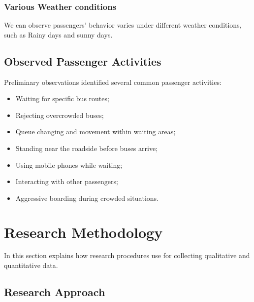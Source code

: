 \documentclass[12pt,a4paper]{report}
\begin{document}


\subsection{Various Weather conditions}
We can observe passengers’ behavior varies under different weather conditions, such as Rainy days and sunny days. 

\section{Observed Passenger Activities}

Preliminary observations identified several common passenger activities:

\begin{itemize}[noitemsep]

\item Waiting for specific bus routes;

\item Rejecting overcrowded buses;

\item Queue changing and movement within waiting areas;

\item Standing near the roadside before buses arrive;

\item Using mobile phones while waiting;

\item Interacting with other passengers;

\item Aggressive boarding during crowded situations.

\end{itemize}



\chapter{Research Methodology}

In this section explains how research procedures use for collecting qualitative and quantitative data.


\section{Research Approach}
\end{document}
